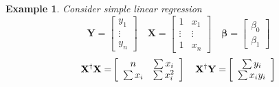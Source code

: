 \documentclass{article}
\newtheorem{example}[theorem]{Example}
\begin{document}
\begin{example}
Consider simple linear regression%
\begin{equation*}
\mathbf{Y=}\left[ 
\begin{array}{c}
y_{1} \\ 
\vdots  \\ 
y_{n}%
\end{array}%
\right] \quad \mathbf{X=}\left[ 
\begin{array}{cc}
1 & x_{1} \\ 
\vdots  & \vdots  \\ 
1 & x_{n}%
\end{array}%
\right] \quad \mathbf{\beta =}\left[ 
\begin{array}{c}
\beta _{0} \\ 
\beta _{1}%
\end{array}%
\right] 
\end{equation*}%
\begin{equation*}
\mathbf{X}^{\dagger }\mathbf{X=}\left[ 
\begin{array}{cc}
n & \tsum x_{i} \\ 
\tsum x_{i} & \tsum x_{i}^{2}%
\end{array}%
\right] \quad \mathbf{X}^{\dagger }\mathbf{Y=}\left[ 
\begin{array}{c}
\tsum y_{i} \\ 
\tsum x_{i}y_{i}%
\end{array}%
\right] 
\end{equation*}
\end{example}
\end{document}
